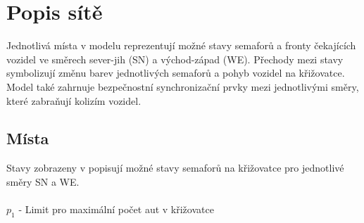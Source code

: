 \section*{Popis sítě}
\label{sec:network_description}

Jednotlivá místa v modelu reprezentují možné stavy semaforů a fronty čekajících vozidel ve směrech sever-jih (SN) a východ-západ (WE).
Přechody mezi stavy symbolizují změnu barev jednotlivých semaforů a pohyb vozidel na křižovatce.
Model také zahrnuje bezpečnostní synchronizační prvky mezi jednotlivými směry, které zabraňují kolizím vozidel.

\subsection*{Místa}
\label{subsec:places}

Stavy zobrazeny v  popisují možné stavy semaforů na křižovatce pro jednotlivé směry SN a WE. \\\\
$p_1$ - Limit pro maximální počet aut v křižovatce

\begin{table}[h!]
    \renewcommand{\arraystretch}{1.3}
    \caption{Tabulku popisu stavů semaforů na křižovatce.}
    \label{tab:places-description}
\end{table}

